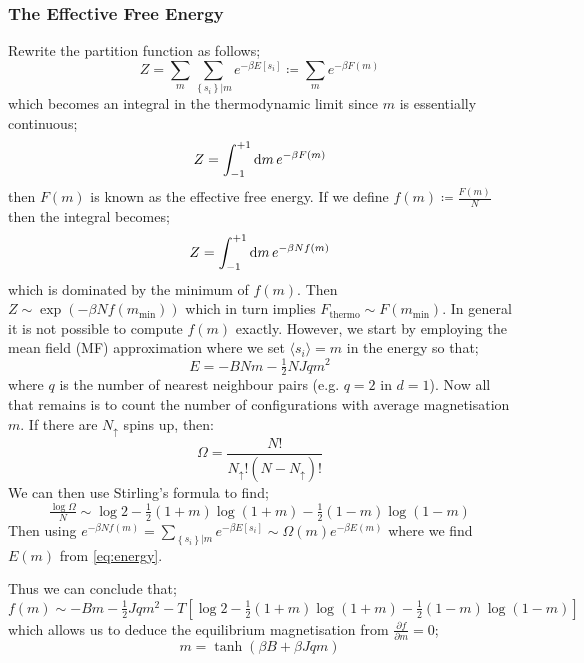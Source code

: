 \subsubsection{The Effective Free Energy}
Rewrite the partition function as follows;
\begin{equation}
Z = \sum_{m}{ \sum_{\left\{ s_i \right\} | m}{e^{-\beta E\left[ s_i \right]}} } \coloneqq \sum_{m}{e^{-\beta F(m)}}
\end{equation}
which becomes an integral in the thermodynamic limit since $m$ is essentially continuous;
\begin{equation}
Z = \int_{-1}^{+1} {\text{d}m \, e^{-\beta F(m)}}
\end{equation}
then $F(m)$ is known as the effective free energy. If we define $f(m) \coloneqq \tfrac{F(m)}{N}$ then the integral becomes;
\begin{equation*}
Z = \int_{-1}^{+1} {\text{d}m \, e^{-\beta N f(m)}}
\end{equation*}
which is dominated by the minimum of $f(m)$. Then $Z \sim \exp\left( -\beta N f\left(m_{\textrm{min}}\right) \right)$ which in turn implies $F_{\textrm{thermo}} \sim F\left(m_{\textrm{min}}\right)$. In general it is not possible to compute $f(m)$ exactly. However, we start by employing the mean field (MF) approximation where we set $\langle s_i \rangle = m$ in the energy so that;
\begin{equation}
\label{eq:energy}
E = -B N m - \tfrac{1}{2} N J q m^2
\end{equation}
where $q$ is the number of nearest neighbour pairs (e.g. $q = 2$ in $d = 1$). Now all that remains is to count the number of configurations with average magnetisation $m$. If there are $N_{\uparrow}$ spins up, then:
\begin{equation}
\Omega = \frac{N!}{N_{\uparrow}!\left( N - N_{\uparrow} \right)!}
\end{equation}
We can then use Stirling's formula to find;
\begin{dmath}
\tfrac{\log \Omega}{N} \sim \log 2 - \tfrac{1}{2}\left( 1 + m \right) \log \left( 1 + m \right) - \tfrac{1}{2}\left( 1 - m \right) \log \left( 1 - m \right)
\end{dmath}
Then using $e^{-\beta N f(m)} = \sum_{\left\{ s_i \right\} | m}{e^{-\beta E \left[ s_i \right]}} \sim \Omega(m) e^{-\beta E(m)}$ where we find $E(m)$ from \eqref{eq:energy}.
\begin{examplebox}
Thus we can conclude that;
\begin{dmath}
f(m) \sim - B m - \tfrac{1}{2} J q m^2 - T \left[ \log 2 - \tfrac{1}{2}\left( 1 + m \right) \log \left( 1 + m \right) - \tfrac{1}{2}\left( 1 - m \right) \log \left( 1 - m \right) \right]
\end{dmath}
which allows us to deduce the equilibrium magnetisation from $\tfrac{\partial f}{\partial m} = 0$;
\begin{equation}
m = \tanh \left( \beta B + \beta J q m \right)
\end{equation}
\end{examplebox}

